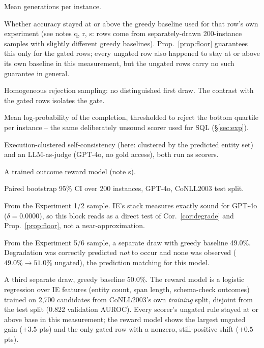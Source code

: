 \documentclass[11pt]{article}
\begin{document}
\begin{table}[!htbp]
\begin{threeparttable}
\begin{minipage}{\columnwidth}
\begin{tablenotes}[flushleft]
\item[b] Mean generations per instance.
\item[c] Whether accuracy stayed at or above the greedy baseline used for that row's own experiment (see notes q, r, s: rows come from separately-drawn 200-instance samples with slightly different greedy baselines). Prop.~\ref{prop:floor} guarantees this only for the gated rows; every ungated row also happened to stay at or above its own baseline in this measurement, but the ungated rows carry no such guarantee in general.
\item[e] Homogeneous rejection sampling: no distinguished first draw. The contrast with the gated rows isolates the gate.
\item[f] Mean log-probability of the completion, thresholded to reject the bottom quartile per instance -- the same deliberately unsound scorer used for SQL (\S\ref{sec:exp}).
\item[j] Execution-clustered self-consistency (here: clustered by the predicted entity set) and an LLM-as-judge (GPT-4o, no gold access), both run as scorers.
\item[l] A trained outcome reward model (note s).
\item[p] Paired bootstrap 95\% CI over 200 instances, GPT-4o, CoNLL2003 test split.
\item[q] From the Experiment 1/2 sample. IE's stack measures exactly sound for GPT-4o ($\delta=0.0000$), so this block reads as a direct test of Cor.~\ref{cor:degrade} and Prop.~\ref{prop:floor}, not a near-approximation.
\item[r] From the Experiment 5/6 sample, a separate draw with greedy baseline 49.0\%. Degradation was correctly predicted \emph{not} to occur and none was observed ($49.0\%\to51.0\%$ ungated), the prediction matching for this model.
\item[s] A third separate draw, greedy baseline 50.0\%. The reward model is a logistic regression over IE features (entity count, span length, schema-check outcomes) trained on 2{,}700 candidates from CoNLL2003's own \emph{training} split, disjoint from the test split (0.822 validation AUROC). Every scorer's ungated rule stayed at or above base in this measurement; the reward model shows the largest ungated gain ($+3.5$ pts) and the only gated row with a nonzero, still-positive shift ($+0.5$ pts).
\end{tablenotes}\end{minipage}
\end{threeparttable}
\caption*{\textbf{IE, GPT-4o} (CoNLL2003 test split; sound stack $=$ \texttt{parses}\,$\wedge$\allowbreak\,\texttt{required\_fields}\,$\wedge$\allowbreak\,\texttt{schema\_valid}\,$\wedge$\allowbreak\,\texttt{no\_overlap}). All three deferred baselines are floor-safe here on GPT-4o (6 of 6 ungated/gated cells; the four-model picture for the confidence scorer alone is in Table~\ref{tab:params}).}


\end{table}
\end{document}
